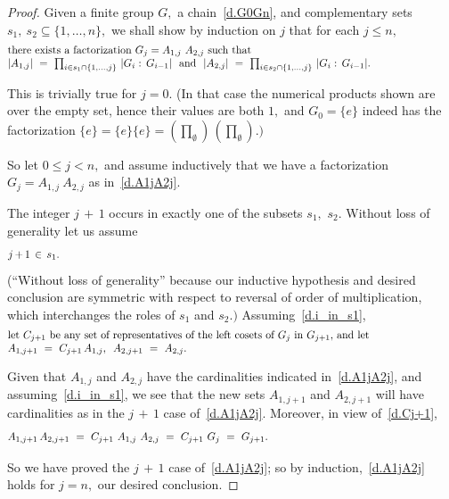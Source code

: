 \documentclass{amsart}
\numberwithin{equation}{section}
\numberwithin{theorem}{section}
\begin{document}
\begin{proof}
Given a finite group $G,$ a chain~\eqref{d.G0Gn}, and
complementary sets $s_1,\ s_2\subseteq\{1,\dots,n\},$
we shall show by induction on $j$ that for each $j\leq n,$
%
\begin{equation}\begin{minipage}[c]{35pc}\label{d.A1jA2j}
there exists a factorization $G_j=A_{1,j}\ A_{2,j}$ such that \\
$|A_{1,j}|\ =\ \prod_{i\in s_1\cap\{1,\dots,j\}}\,|G_i:\,G_{i-1}|$ \ and
\ $|A_{2,j}|\ =\ \prod_{i\in s_2\cap\{1,\dots,j\}}\,|G_i:\,G_{i-1}|.$
\end{minipage}\end{equation}

This is trivially true for $j=0.$
(In that case the numerical products shown are over the empty set,
hence their values are both $1,$ and
$G_0=\{e\}$ indeed has the factorization $\{e\}=\{e\}\{e\}=
(\prod_\emptyset)\,(\prod_\emptyset).)$

So let $0\leq j<n,$ and assume inductively that
we have a factorization $G_j=A_{1,j}\ A_{2,j}$ as in~\eqref{d.A1jA2j}.

The integer $j\,{+}\,1$ occurs in exactly
one of the subsets $s_1,$ $s_2.$
Without loss of generality let us assume
%
\begin{equation}\begin{minipage}[c]{35pc}\label{d.i_in_s1}
$j\,{+}\,1\,\in\,s_1.$
\end{minipage}\end{equation}
%
(``Without loss of generality'' because our inductive
hypothesis and desired conclusion are symmetric
with respect to reversal of order of multiplication, which
interchanges the roles of $s_1$ and $s_2.)$
Assuming~\eqref{d.i_in_s1},
%
\begin{equation}\begin{minipage}[c]{35pc}\label{d.Cj+1}
let $C_{j+1}$ be any set of representatives
of the left cosets of $G_j$ in $G_{j+1},$ and let \\
$A_{1,j+1}\ =\ C_{j+1}\,A_{1,j},$ \ $A_{2,j+1}\ =\ A_{2,j}.$
\end{minipage}\end{equation}

Given that $A_{1,j}$ and $A_{2,j}$
have the cardinalities indicated in~\eqref{d.A1jA2j},
and assuming~\eqref{d.i_in_s1}, we see that
the new sets $A_{1,j+1}$ and $A_{2,j+1}$ will
have cardinalities as in the $j\,{+}\,1$ case of~\eqref{d.A1jA2j}.
Moreover, in view of~\eqref{d.Cj+1},
%
\begin{equation}\begin{minipage}[c]{35pc}\label{d.CiA1}
$A_{1,j+1}\,A_{2,j+1}\ =\ C_{j+1}\ A_{1,j}\ A_{2,j}\ =\ C_{j+1}\ G_j\
=\ G_{j+1}.$
\end{minipage}\end{equation}

So we have proved the $j\,{+}\,1$ case of~\eqref{d.A1jA2j}; so by
induction,~\eqref{d.A1jA2j} holds for $j=n,$ our desired conclusion.
\end{proof}
\end{document}
